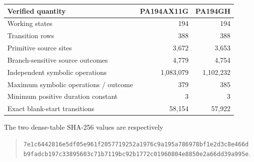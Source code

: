 \begin{center}
\begin{tabular}{lrr}
\toprule Verified quantity & PA194AX11G & PA194GH\\\midrule
Working states & 194 & 194 \\
Transition rows & 388 & 388 \\
Primitive source sites & 3,672 & 3,653 \\
Branch-sensitive source outcomes & 4,779 & 4,754 \\
Independent symbolic operations & 1,083,079 & 1,102,232 \\
Maximum symbolic operations / outcome & 379 & 385 \\
Minimum positive duration constant & 3 & 3 \\
Exact blank-start transitions & 58,154 & 57,922 \\
\bottomrule\end{tabular}
\end{center}
The two dense-table SHA-256 values are respectively
\begin{quote}\small
\nolinkurl{7e1c6442816e5df05e961f2057719252a1976c9a195a786978bf1e2d3c8e466d}\\
\nolinkurl{b9fadcb197c33895603c71b7119bc92b1772c01960804e8850e2a66dd39a995e}.
\end{quote}
